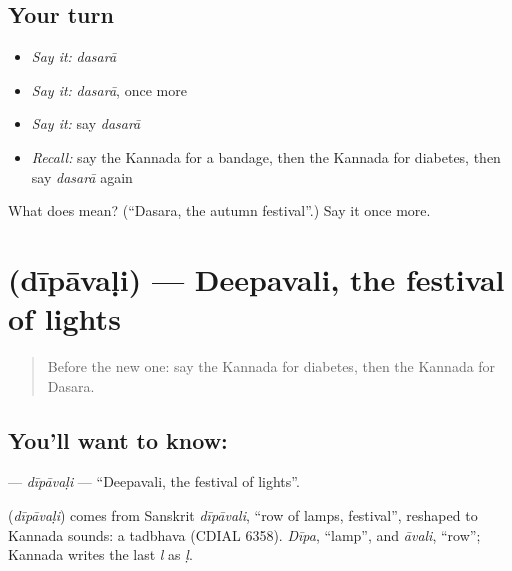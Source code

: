 \subsection*{Your turn}
\begin{itemize}
\raggedright
  \item \emph{Say it:} \emph{dasarā}
  \item \emph{Say it:} \emph{dasarā}, once more
  \item \emph{Say it:} say \emph{dasarā}
  \item \emph{Recall:} say the Kannada for a bandage, then the Kannada for diabetes, then say \emph{dasarā} again
\end{itemize}

\begin{tcolorbox}[breakable,colback=teal!4,colframe=teal!35!black,title={Before you move on}]
What does  mean? (\textquotedblleft{}Dasara, the autumn festival\textquotedblright{}.) Say it once more.
\end{tcolorbox}
\section[\texorpdfstring{\kn{ದೀಪಾವಳಿ} (dīpāvaḷi)}{ದೀಪಾವಳಿ (dīpāvaḷi)}]{ (dīpāvaḷi) — Deepavali, the festival of lights}

\label{lesson:KA-C247-dipavali}



\begin{quote}
Before the new one: say the Kannada for diabetes, then the Kannada for Dasara.
\end{quote}

\subsection*{You'll want to know: }
\textbf{} — \emph{dīpāvaḷi} — \textquotedblleft{}Deepavali, the festival of lights\textquotedblright{}.

\begin{cousinweb}
\textbf{} (\emph{dīpāvaḷi}) comes from Sanskrit \emph{dīpāvali}, \textquotedblleft{}row of lamps, festival\textquotedblright{}, reshaped to Kannada sounds: a tadbhava (CDIAL 6358). \emph{Dīpa}, \textquotedblleft{}lamp\textquotedblright{}, and \emph{āvali}, \textquotedblleft{}row\textquotedblright{}; Kannada writes the last \emph{l} as \emph{ḷ}.
\end{cousinweb}

